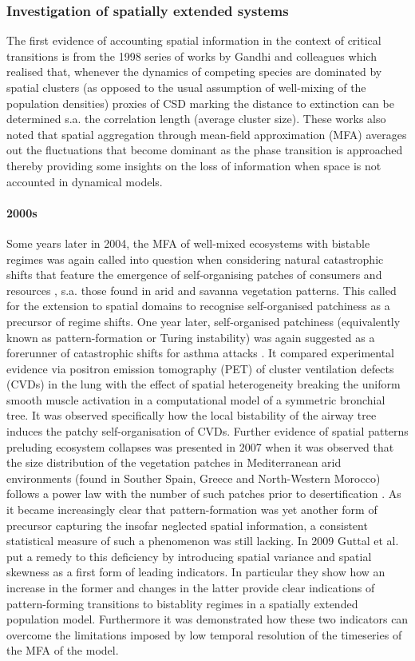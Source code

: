 \documentclass[../main.tex]{subfiles}
\begin{document}
\subsubsection{Investigation of spatially extended systems}\label{subsubsec1.2.4}
The first evidence of accounting spatial information in the context of critical transitions is from the 1998 series of works by Gandhi and colleagues \cite{Gandhi98} which realised that, whenever the dynamics of competing species are dominated by spatial clusters (as opposed to the usual assumption of well-mixing of the population densities) proxies of CSD marking the distance to extinction can be determined s.a. the correlation length (average cluster size). 
These works also noted that spatial aggregation through mean-field approximation (MFA) averages out the fluctuations that become dominant as the phase transition is approached thereby providing some insights on the loss of information when space is not accounted in dynamical models.
\paragraph{2000s}
Some years later in 2004, the MFA of well-mixed ecosystems with bistable regimes was again called into question when considering natural catastrophic shifts that feature the emergence of self-organising patches of consumers and resources \cite{Rietkerk04}, s.a. those found in arid and savanna vegetation patterns. 
This called for the extension to spatial domains to recognise self-organised patchiness as a precursor of regime shifts.
One year later, self-organised patchiness (equivalently known as pattern-formation or Turing instability) was again suggested as a forerunner of catastrophic shifts for asthma attacks \cite{Venegas05}. 
It compared experimental evidence via positron emission tomography (PET) of cluster ventilation defects (CVDs) in the lung with the effect of spatial heterogeneity breaking the uniform smooth muscle activation in a computational model of a symmetric bronchial tree. 
It was observed specifically how the local bistability of the airway tree induces the patchy self-organisation of CVDs. 
Further evidence of spatial patterns preluding ecosystem collapses was presented in 2007 when it was observed that the size distribution of the vegetation patches in Mediterranean arid environments (found in Souther Spain, Greece and North-Western Morocco) follows a power law with the number of such patches prior to desertification \cite{Kefi07}. 
As it became increasingly clear that pattern-formation was yet another form of precursor capturing the insofar neglected spatial information, a consistent statistical measure of such a phenomenon was still lacking.
In 2009 Guttal et al. \cite{Guttal09} put a remedy to this deficiency by introducing spatial variance and spatial skewness as a first form of leading indicators. 
In particular they show how an increase in the former and changes in the latter provide clear indications of pattern-forming transitions to bistablity regimes in a spatially extended population model.
Furthermore it was demonstrated how these two indicators can overcome the limitations imposed by low temporal resolution of the timeseries of the MFA of the model.
\end{document}
